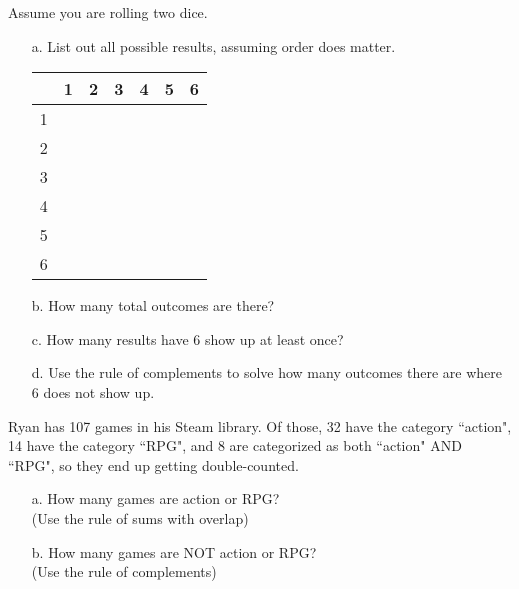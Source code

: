     \begin{questionNOGRADE}{\thequestion}
        Assume you are rolling two dice.

        \begin{enumerate}
            \item[a.]   List out all possible results, assuming order does matter.
            \begin{center}
                \Large 
                \begin{tabular}{ c | p{1cm} p{1cm} p{1cm} p{1cm} p{1cm} p{1cm} }
                    & 1 & 2 & 3 & 4 & 5 & 6
                    \\ \hline
                    1 \\ 2 \\ 3 \\ 4 \\ 5 \\ 6 
                \end{tabular}
            \end{center}

            \item[b.]   How many total outcomes are there?

            \item[c.]   How many results have 6 show up at least once?

            \item[d.]   Use the rule of complements to solve how many
                        outcomes there are where 6 does not show up.
        \end{enumerate}
    \end{questionNOGRADE}

    \begin{questionNOGRADE}{\thequestion}
            Ryan has 107 games in his Steam library.
            Of those, 32 have the category ``action",
            14 have the category ``RPG",
            and 8 are categorized as both ``action" AND ``RPG", so they end up getting double-counted.

        \begin{enumerate}
            \item[a.] How many games are action or RPG? \\(Use the rule of sums with overlap)
            \item[b.] How many games are NOT action or RPG? \\(Use the rule of complements)
        \end{enumerate}        
    \end{questionNOGRADE}

